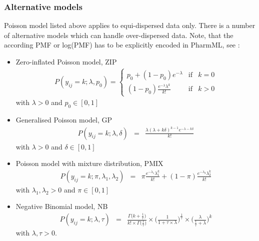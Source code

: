 \subsubsection{Alternative models} 
\label{subsubsec:alternatives}
Poisson model listed above applies to equi-dispersed data only.
There is a number of alternative models which can handle over-dispersed data. 
Note, that the according PMF or log(PMF) has to be explicitly encoded in PharmML, see \cite{Plan:2009fk}:
\begin{itemize}%
\item
Zero-inflated Poisson model, ZIP
\begin{eqnarray}
P(y_{ij} = k; \lambda, p_0) =  \left\{ \begin{array}{rcl} p_0 + (1-p_0) e^{-\lambda} & \mbox{if} & k = 0 \\ 
(1-p_0)\frac{e^{-\lambda}\lambda^k}{k!} & \mbox{if} & k > 0 \end{array}\right. \nonumber
\end{eqnarray}
with $\lambda > 0$ and $p_0 \in [0,1]$
\item
Generalised Poisson model, GP
\begin{eqnarray}
P(y_{ij} = k; \lambda, \delta) &=& \frac{\lambda (\lambda + k \delta)^{k-1} e^{-\lambda - k\delta}}{k!} \nonumber
\end{eqnarray}
with $\lambda > 0$ and  $\delta \in [0,1]$
\item
Poisson model with mixture distribution, PMIX
\begin{eqnarray}
P(y_{ij} = k;\pi,\lambda_1,\lambda_2) &=& \pi \frac{e^{-\lambda_1} \lambda_1^k}{k!} + (1-\pi) \frac{e^{-\lambda_2} \lambda_2^k}{k!} \nonumber
\end{eqnarray}
with $\lambda_1, \lambda_2 > 0$ and $\pi \in [0,1]$
\item
Negative Binomial model, NB
\begin{eqnarray}
P(y_{ij} = k;\lambda,\tau) &=& \frac{\Gamma \big( k + \frac{1}{\tau} \big)}{k! \times \Gamma \big(\frac{1}{\tau} \big)} \times \Bigg( \frac{1}{1 + \tau \times \lambda} \Bigg)^{\frac{1}{\tau}} \times \Bigg(\frac{\lambda}{\frac{1}{\tau} + \lambda} \Bigg)^k \nonumber
\end{eqnarray}
with $\lambda, \tau > 0$.
\end{itemize}

